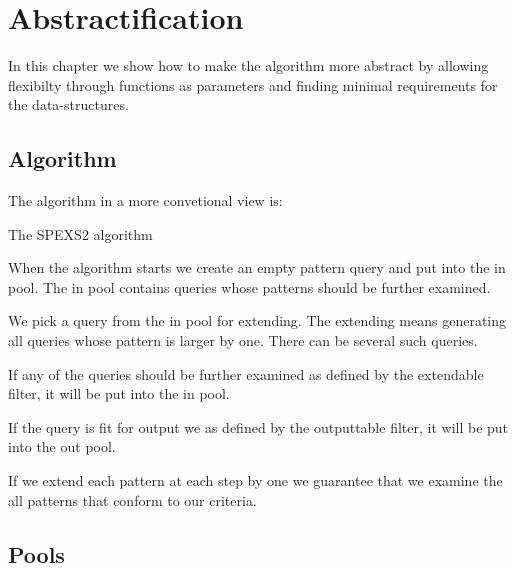\chapter{Abstractification}

In this chapter we show how to make the algorithm more 
abstract by allowing flexibilty through functions as parameters and
finding minimal requirements for the data-structures.

\section{Algorithm}

The algorithm in a more convetional view is:

\begin{algorithm}[H]
	\caption{The SPEXS2 algorithm}
\begin{algorithmic}[1]
			\EndIf
			\EndIf
		\EndFor
	\EndWhile
\end{algorithmic}
\end{algorithm}

When the algorithm starts we create an empty pattern query and put 
into the in pool. The in pool contains queries whose patterns
should be further examined.

We pick a query from the in pool for extending. The extending means
generating all queries whose pattern is larger by one. There can be
several such queries.

If any of the queries should be further examined as defined by the
extendable filter, it will be put into the in pool.

If the query is fit for output we as defined by the outputtable filter,
it will be put into the out pool.

If we extend each pattern at each step by one we guarantee that we
examine the all patterns that conform to our criteria.

\section{Pools}

